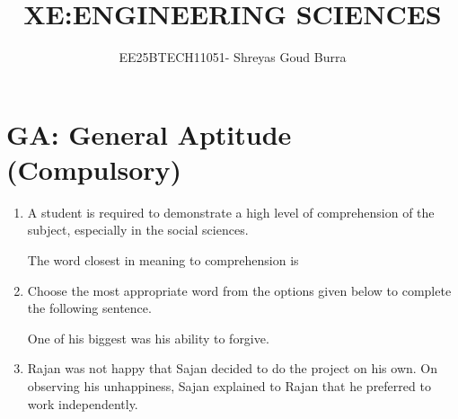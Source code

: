 \documentclass[a4paper,10pt]{article}
\title{XE:ENGINEERING SCIENCES}
\author{EE25BTECH11051- Shreyas Goud Burra}
\date{}
\begin{document}
\maketitle

\section*{GA: General Aptitude (Compulsory)}

\begin{enumerate}
    \item A student is required to demonstrate a high level of comprehension of the subject, especially in the social sciences.
    
    The word closest in meaning to comprehension is \underline{\hspace{2cm}}
    
    \hfill{}
    \begin{enumerate}
    \end{enumerate}

    \item Choose the most appropriate word from the options given below to complete the following sentence.
    
    One of his biggest \underline{\hspace{2cm}} was his ability to forgive.
    
    \hfill{}
    \begin{enumerate}
    \end{enumerate}

    \item Rajan was not happy that Sajan decided to do the project on his own. On observing his unhappiness, Sajan explained to Rajan that he preferred to work independently.
    

\end{enumerate}
\end{document}
